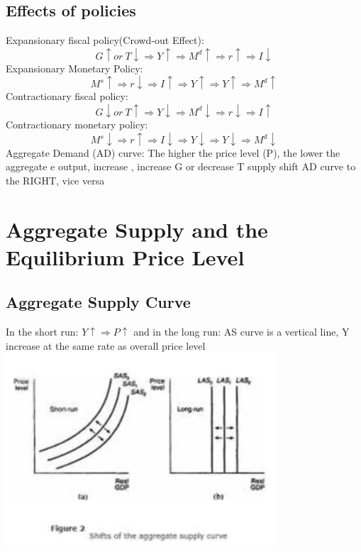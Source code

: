 \documentclass[11pt]{article}
\begin{document}
\subsection{Effects of policies}
Expansionary fiscal policy(Crowd-out Effect):
\begin{equation}
    G\uparrow or\ T\downarrow \Rightarrow Y\uparrow \Rightarrow M^d\uparrow \Rightarrow r\uparrow \Rightarrow I\downarrow
\end{equation}
Expansionary Monetary Policy:
\begin{equation}
    M^s\uparrow \Rightarrow r\downarrow \Rightarrow I\uparrow \Rightarrow Y\uparrow \Rightarrow Y\uparrow \Rightarrow M^d \uparrow
\end{equation}
Contractionary fiscal policy:
\begin{equation}
    G\downarrow or\ T\uparrow \Rightarrow Y\downarrow \Rightarrow M^d\downarrow \Rightarrow r\downarrow \Rightarrow I\uparrow
\end{equation}
Contractionary monetary policy: 
\begin{equation}
    M^s\downarrow \Rightarrow r\uparrow \Rightarrow I\downarrow \Rightarrow Y\downarrow \Rightarrow Y\downarrow \Rightarrow M^d \downarrow
\end{equation}
Aggregate Demand (AD) curve: The higher the price level (P), the lower the aggregate e output, increase  , increase G or decrease T supply shift AD curve to the RIGHT, vice versa

\section{Aggregate Supply and the Equilibrium Price Level}
\subsection{Aggregate Supply Curve}
In the short run: $Y\uparrow \Rightarrow P\uparrow$
and
in the long run: AS curve is a vertical line, Y increase at the same rate as overall price level\\
\includegraphics[width=10cm]{aggregate.png}
\end{document}
